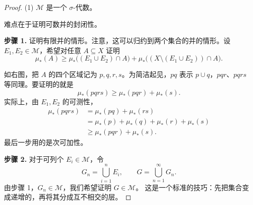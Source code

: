 \documentclass[12pt,letterpaper,twoside,openright]{ctexbook}
\theoremstyle{bluehead}
\theoremstyle{olivehead}
\theoremstyle{orangehead}
\theoremstyle{redremark}
\begin{document}
\begin{proof}
\textup{(1)} $\mathcal{M}$ 是一个 $\sigma$-代数。

难点在于证明可数并的封闭性。

\textbf{步骤 1.} 证明有限并的情形。注意，这可以归约到两个集合的并的情形。设 $E_1,E_2\in\mathcal{M}$，希望对任意 $A\subseteq X$ 证明
\[
  \mu_*(A)\geq
  \mu_*\bigl((E_1\cup E_2)\cap A\bigr)
  +\mu_*\bigl((X\setminus(E_1\cup E_2))\cap A\bigr).
\]
\medskip
\noindent
\begin{minipage}[c]{0.60\textwidth}
如右图，把 $A$ 的四个区域记为 $p,q,r,s$。为简洁起见，$pq$ 表示 $p\cup q$，$pqr$、$pqrs$ 等同理。要证明的就是
\[
  \mu_*(pqrs)\geq\mu_*(pqr)+\mu_*(s).
\]
实际上，由 $E_1,E_2$ 的可测性，
\[
\begin{aligned}
  \mu_*(pqrs)&=\mu_*(pq)+\mu_*(rs)\\
  &=\mu_*(p)+\mu_*(q)+\mu_*(r)+\mu_*(s)\\
  &\geq\mu_*(pqr)+\mu_*(s).
\end{aligned}
\]
最后一步用的是次可加性。
\end{minipage}\hfill
\begin{minipage}[c]{0.36\textwidth}
\centering
{}
\end{minipage}
\medskip

\textbf{步骤 2.} 对于可列个 $E_i\in\mathcal{M}$，令
\[
  G_n=\bigcup_{i=1}^{n}E_i,
  \qquad G=\bigcup_{n=1}^{\infty}G_n.
\]
由步骤 1，$G_n\in\mathcal{M}$，我们希望证明 $G\in\mathcal{M}$。
这是一个标准的技巧：先把集合变成递增的，再将其分成互不相交的层。


\end{proof}
\end{document}

